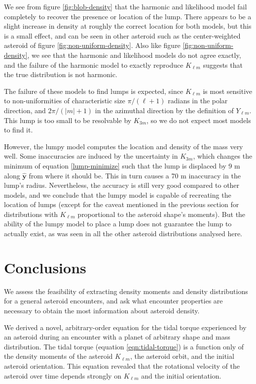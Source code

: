 \documentclass[fleqn,usenatbib]{mnras}
\newcommand{\unit}[1]{\bm{\hat{#1}}}
\begin{document}
We see from figure \ref{fig:blob-density} that the harmonic and likelihood model fail completely to recover the presence or location of the lump. There appears to be a slight increase in density at roughly the correct location for both models, but this is a small effect, and can be seen in other asteroid such as the center-weighted asteroid of figure \ref{fig:non-uniform-density}. Also like figure \ref{fig:non-uniform-density}, we see that the harmonic and likelihood models do not agree exactly, and the failure of the harmonic model to exactly reproduce $K_{\ell m}$ suggests that the true distribution is not harmonic.

The failure of these models to find lumps is expected, since $K_{\ell m}$ is most sensitive to non-uniformities of characteristic size $\pi/(\ell + 1)$ radians in the polar direction, and $2\pi / (|m|+1)$ in the azimuthal direction by the definition of $Y_{\ell m}$. This lump is too small to be resolvable by $K_{3m}$, so we do not expect most models to find it.

However, the lumpy model computes the location and density of the mass very well. Some inaccuracies are induced by the uncertainty in $K_{3m}$, which changes the minimum of equation \ref{lump-minimize} such that the lump is displaced by 9 m along $\unit y$ from where it should be. This in turn causes a 70 m inaccuracy in the lump's radius. Nevertheless, the accuracy is still very good compared to other models, and we conclude that the lumpy model is capable of recreating the location of lumps (except for the caveat mentioned in the previous section for distributions with $K_{\ell m}$ proportional to the asteroid shape's moments). But the ability of the lumpy model to place a lump does not guarantee the lump to actually exist, as was seen in all the other asteroid distributions analysed here.

\section{Conclusions}

We assess the feasibility of extracting density moments and density distributions for a general asteroid encounters, and ask what encounter properties are necessary to obtain the most information about asteroid density.

We derived a novel, arbitrary-order equation for the tidal torque experienced by an asteroid during an encounter with a planet of arbitrary shape and mass distribution. The tidal torque (equation \ref{eqn:tidal-torque}) is a function only of the density moments of the asteroid $K_{\ell m}$, the asteroid orbit, and the initial asteroid orientation. This equation revealed that the rotational velocity of the asteroid over time depends strongly on $K_{\ell m}$ and the initial orientation.
\end{document}
